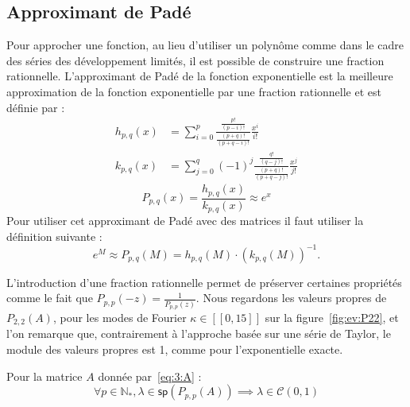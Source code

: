 \subsection{Approximant de Padé}

Pour approcher une fonction, au lieu d'utiliser un polynôme comme dans le cadre des séries des développement limités, il est possible de construire une fraction rationnelle. L'approximant de Padé de la fonction exponentielle est la meilleure approximation de la fonction exponentielle par une fraction rationnelle et est définie par :
$$
  \begin{aligned}
    h_{p,q}(x) &= \sum_{i=0}^p \frac{\frac{p!}{(p-i)!}}{\frac{(p+q)!}{(p+q-i)!}}\frac{x^i}{i!} \\
    k_{p,q}(x) &= \sum_{j=0}^q (-1)^j \frac{\frac{q!}{(q-j)!}}{\frac{(p+q)!}{(p+q-j)!}} \frac{x^j}{j!}
  \end{aligned}
$$
$$
  P_{p,q}(x) = \frac{h_{p,q}(x)}{k_{p,q}(x)} \approx e^x
$$
Pour utiliser cet approximant de Padé avec des matrices il faut utiliser la définition suivante :
$$
  e^M \approx P_{p,q}(M) = h_{p,q}(M)\cdot\left(k_{p,q}(M)\right)^{-1}.
$$

L'introduction d'une fraction rationnelle permet de préserver certaines propriétés comme le fait que $P_{p,p}(-z) = \frac{1}{P_{p,p}(z)}$. Nous regardons les valeurs propres de $P_{2,2}(A)$, pour les modes de Fourier $\kappa\in[\![0,15]\!]$ sur la figure~\ref{fig:ev:P22}, et l'on remarque que, contrairement à l'approche basée sur une série de Taylor, le module des valeurs propres est 1, comme pour l'exponentielle exacte.

\begin{pro}
  Pour la matrice $A$ donnée par~\eqref{eq:3:A} :
  $$
    \forall p\in\mathbb{N}_*, \lambda\in\textsf{sp}(P_{p,p}(A)) \implies \lambda\in\mathcal{C}(0,1)
  $$
\end{pro}

